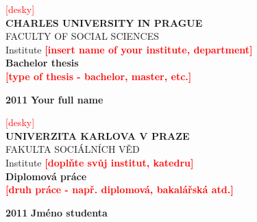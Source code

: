 \begin{center}
\textcolor{red}{[desky]} \\
\textbf{\LARGE{CHARLES UNIVERSITY IN PRAGUE}}\\
\Large{FACULTY OF SOCIAL SCIENCES}\\
\large{Institute }\normalsize{\textbf{\textcolor{red}{[insert name of your institute, department]}}} \\
\vspace{60mm} \textbf{\LARGE{Bachelor thesis}}\\
\normalsize{\textbf{\textcolor{red}{[type of thesis - bachelor, master, etc.]}}} \\
\end{center}
\vspace{100mm} \textbf{\LARGE{2011}}  \hspace {65mm} \textbf{\LARGE{Your full name}}\\
\vspace{11mm}
\newpage

\pagestyle{empty}
\begin{center}
\textcolor{red}{[desky]} \\
\textbf{\LARGE{UNIVERZITA KARLOVA V PRAZE}}\\
\Large{FAKULTA SOCI\'{A}LN\'{I}CH V\v{E}D}\\
\large{Institute }\normalsize{\textbf{\textcolor{red}{[doplňte svůj institut, katedru]}}} \\
\vspace{60mm} \textbf{\LARGE{Diplomová práce}}\\
\normalsize{\textbf{\textcolor{red}{[druh práce - např. diplomová, bakalářská atd.]}}} \\
\end{center}
\vspace{100mm} \textbf{\LARGE{2011}}  \hspace {65mm} \textbf{\LARGE{Jméno studenta}}\\
\vspace{11mm}
\newpage

